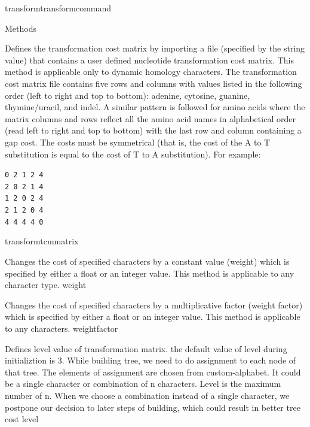 \begin{command}{transform}{transformcommand}
\begin{arguments}
\begin{argumentgroup}{Methods}
            {Defines the transformation cost matrix by importing a file (specified by
            the string value) that contains a user defined nucleotide
            transformation cost matrix. This method is applicable only to dynamic homology characters.
            The transformation cost matrix file contains five rows and columns
            with values listed in the following order (left to right and top to
            bottom): adenine, cytosine, guanine,
            thymine/uracil, and indel.  A similar pattern is followed for amino acids
            where the matrix columns and rows reflect all the amino acid names in alphabetical order
            (read left to right and top to bottom) with the last row and column containing a gap cost. 
            The costs must be symmetrical (that is, the
            cost of the A to T substitution is equal to the cost of T to A
            substitution). For example:
	        \begin{center}
            \texttt{0 2 1 2 4 \\
            2 0 2 1 4 \\
            1 2 0 2 4 \\
            2 1 2 0 4 \\
            4 4 4 4 0} 
            \end{center}
            }
            {transformtcmmatrix}

            {Changes the cost of specified characters by a
            constant value (weight) which is specified by either a
            float or an integer value. This method is applicable to any character type.} 
            {weight}

            {Changes the cost of specified characters by a
            multiplicative factor (weight factor) which is specified by either a
            float or an integer value. This method is applicable to any characters.} 
            {weightfactor}

            {Defines level value of transformation matrix. the default value of
            level during initializtion is 3. While building tree, we need to
            do assignment to each node of that tree. The elements of assignment
            are chosen from custom-alphabet. It could be a single character or
            combination of n characters.  Level is the maximum number of n.
            When we choose a combination instead of a single character, we
            postpone our decision to later steps of building, which could
            result in better tree cost }
            {level}



\end{argumentgroup}
\end{arguments}
\end{command}
